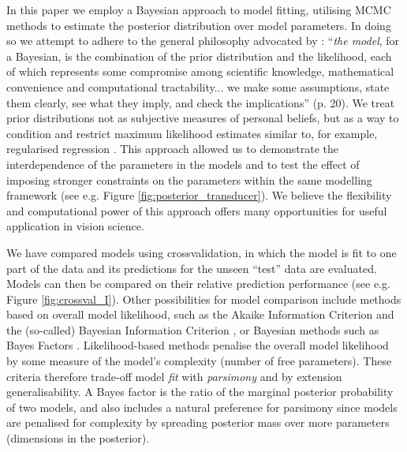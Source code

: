 \documentclass[11pt,a4paper]{article}
\begin{document}
{In this paper we employ a Bayesian approach to model fitting, utilising MCMC methods to estimate the posterior distribution over model parameters.
In doing so we attempt to adhere to the general philosophy advocated by \citet{Gelman2012a}: ``\textit{the model}, for a Bayesian, is the combination of the prior distribution and the likelihood, each of which represents some compromise among scientific knowledge, mathematical convenience and computational tractability... we make some assumptions, state them clearly, see what they imply, and check the implications'' (p. 20).
We treat prior distributions not as subjective measures of personal beliefs, but as a way to condition and restrict maximum likelihood estimates similar to, for example, regularised regression \citep{Hastie2009}. 
This approach allowed us to demonstrate the interdependence of the parameters in the models and to test the effect of imposing stronger constraints on the parameters within the same modelling framework (see e.g. Figure \ref{fig:posterior_transducer}).
We believe the flexibility and computational power of this approach offers many opportunities for useful application in vision science.

We have compared models using crossvalidation, in which the model is fit to one part of the data and its predictions for the unseen ``test'' data are evaluated.
Models can then be compared on their relative prediction performance (see e.g. Figure \ref{fig:crossval_I}).
Other possibilities for model comparison include methods based on overall model likelihood, such as the Akaike Information Criterion \citep[AIC;][]{Akaike1974} and the (so-called) Bayesian Information Criterion \citep[BIC;][]{Schwarz1978, Raftery1995}, or Bayesian methods such as Bayes Factors \citep[e.g.][]{Kass1995, Lee2014}.
Likelihood-based methods penalise the overall model likelihood by some measure of the model's complexity (number of free parameters). 
These criteria therefore trade-off model \textit{fit} with \textit{parsimony} and by extension generalisability.
A Bayes factor is the ratio of the marginal posterior probability of two models, and also includes a natural preference for parsimony since models are penalised for complexity by spreading posterior mass over more parameters (dimensions in the posterior).

}
\end{document}
